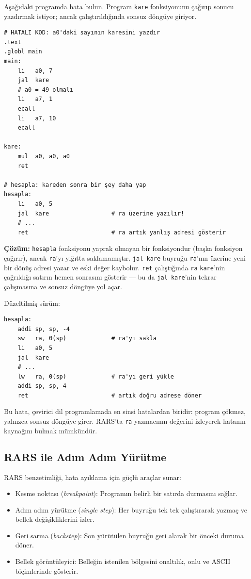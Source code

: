 \begin{ornek}[4.24]
\label{orn:hata-ra}
Aşağıdaki programda hata bulun. Program \texttt{kare} fonksiyonunu çağırıp sonucu yazdırmak istiyor; ancak çalıştırıldığında sonsuz döngüye giriyor.

\begin{lstlisting}[style=riscv]
# HATALI KOD: a0'daki sayının karesini yazdır
.text
.globl main
main:
    li   a0, 7
    jal  kare
    # a0 = 49 olmalı
    li   a7, 1
    ecall
    li   a7, 10
    ecall

kare:
    mul  a0, a0, a0
    ret

# hesapla: kareden sonra bir şey daha yap
hesapla:
    li   a0, 5
    jal  kare                  # ra üzerine yazılır!
    # ...
    ret                        # ra artık yanlış adresi gösterir
\end{lstlisting}

\textbf{Çözüm:} \texttt{hesapla} fonksiyonu yaprak olmayan bir fonksiyondur (başka fonksiyon çağırır), ancak \texttt{ra}'yı yığıtta saklamamıştır. \texttt{jal kare} buyruğu \texttt{ra}'nın üzerine yeni bir dönüş adresi yazar ve eski değer kaybolur. \texttt{ret} çalıştığında \texttt{ra} \texttt{kare}'nin çağrıldığı satırın hemen sonrasını gösterir --- bu da \texttt{jal kare}'nin tekrar çalışmasına ve sonsuz döngüye yol açar.

Düzeltilmiş sürüm:

\begin{lstlisting}[style=riscv]
hesapla:
    addi sp, sp, -4
    sw   ra, 0(sp)             # ra'yı sakla
    li   a0, 5
    jal  kare
    # ...
    lw   ra, 0(sp)             # ra'yı geri yükle
    addi sp, sp, 4
    ret                        # artık doğru adrese döner
\end{lstlisting}

Bu hata, çevirici dil programlamada en sinsi hatalardan biridir: program çökmez, yalnızca sonsuz döngüye girer. RARS'ta \texttt{ra} yazmacının değerini izleyerek hatanın kaynağını bulmak mümkündür.
\end{ornek}

\subsection{RARS ile Adım Adım Yürütme}
\label{subsec:rars-hata-ayiklama}

RARS benzetimliği, hata ayıklama için güçlü araçlar sunar:

\begin{itemize}
\item Kesme noktası (\emph{breakpoint}): Programın belirli bir satırda durmasını sağlar.
\item Adım adım yürütme (\emph{single step}): Her buyruğu tek tek çalıştırarak yazmaç ve bellek değişikliklerini izler.
\item Geri sarma (\emph{backstep}): Son yürütülen buyruğu geri alarak bir önceki duruma döner.
\item Bellek görüntüleyici: Belleğin istenilen bölgesini onaltılık, onlu ve ASCII biçimlerinde gösterir.
\end{itemize}

